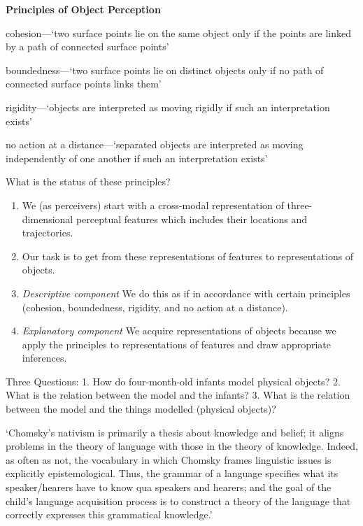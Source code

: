 \documentclass[12pt]{extarticle}
\begin{document}
\begin{multicols}{3}
\textbf{Principles of Object Perception \citep{Spelke:1990jn}}
 
cohesion—‘two surface points lie on the same object only if the points are linked by a path of 
connected surface points’
 
boundedness—‘two surface points lie on distinct objects only if no path of connected surface points 
links them’
 
rigidity—‘objects are interpreted as moving rigidly if such an interpretation exists’
 
no action at a distance—‘separated objects are interpreted as moving independently of one another if such an 
interpretation exists’
 
 
What is the status of these principles?
 
\begin{enumerate}

\item We (as perceivers) start with a cross-modal representation of three-dimensional 
perceptual features which includes their locations and trajectories.

\item Our task is to get from these representations of features to representations of objects.

\item \emph{Descriptive component} We do this as if in accordance with certain principles 
(cohesion, boundedness, rigidity, and no action at a distance).

\item \emph{Explanatory component}  We acquire representations of objects because we apply the 
principles to representations of features and draw appropriate inferences.

\end{enumerate}

Three Questions: 
1. How do four-month-old infants model physical objects?
2. What is the relation between the model and the infants?
3. What is the relation between the model and the things modelled (physical objects)?

 
‘Chomsky’s nativism is primarily a thesis about knowledge and belief; it aligns problems 
in the theory of language with those in the theory of knowledge.  Indeed, as often as not, 
the vocabulary in which Chomsky frames linguistic issues is explicitly epistemological.  
Thus, the grammar of a language specifies what its speaker/hearers have to know qua speakers 
and hearers; and the goal of the child’s language acquisition process is to construct a 
theory of the language that correctly expresses this grammatical knowledge.’
\citep[p.\ 11]{Fodor:2000cj}
 

\end{multicols}
\end{document}
